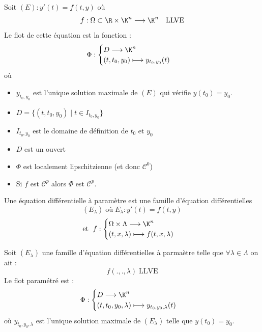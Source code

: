 \begin{definition}[Flot]
    Soit $(E) : y'(t) = f(t,y)$ où 
        \[ f : \Omega \subset \R \times \K^n \longrightarrow \K^n \quad \text{LLVE} \] 
    Le flot de cette équation est la fonction : 
        \[ \Phi : 
            \begin{cases}
                D \longrightarrow \K^n \\ 
                (t,t_0, y_0) \longmapsto y_{t_0, y_0}(t) 
            \end{cases} \] 
    où 
    \begin{itemize}
        \item $y_{t_0, y_0}$ est l'unique solution maximale de $(E)$ qui vérifie $y(t_0) = y_0$. 
        \item $D = \{(t,t_0, y_0) \; | \; t \in I_{t_0, y_0}\} $
        \item $I_{t_0, y_0}$ est le domaine de définition de $t_0$ et $y_0$
    \end{itemize}
\end{definition}

\begin{prop}[Flot]
    \begin{itemize}
        \item $D$ est un ouvert 
        \item $\Phi$ est localement lipschitzienne (et donc $ \mathcal{C}^0$)
        \item Si $f$ est $ \mathcal{C}^p$ alors $\Phi$ est $ \mathcal{C}^p$. 
    \end{itemize}
\end{prop}

\begin{definition}
    Une équation différentielle à paramètre est une famille d'équation différentielles 
        \[ (E_\lambda) \; \text{où} \; E_\lambda : y'(t) = f(t,y) \] 
        \[ \text{et } \;  f : 
            \begin{cases}
                \Omega \times \Lambda \longrightarrow \K^n \\ 
                (t,x,\lambda) \longmapsto f(t,x,\lambda)
            \end{cases} \] 
\end{definition}

\begin{definition}
    Soit $(E_\lambda)$ une famille d'équation différentielles à parmaètre telle que $ \forall \lambda \in \Lambda$ 
    on ait :
        \[ f(.,.,\lambda) \; \text{LLVE} \] 
    Le flot paramétré est : 
        \[ \Phi : 
            \begin{cases}
                D \longrightarrow \K^n \\ 
                (t,t_0,y_0,\lambda) \longmapsto y_{t_0, y_0, \lambda}(t) 
            \end{cases} \] 
    où $y_{t_0, y_0, \lambda}$ est l'unique solution maximale de $(E_\lambda)$ telle que $y(t_0) = y_0$. 
\end{definition}

